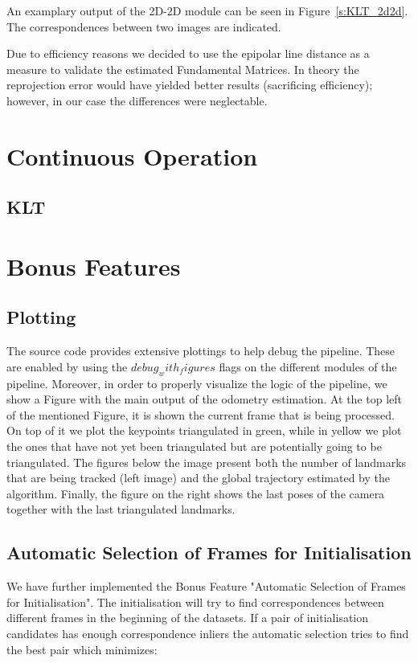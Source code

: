 An examplary output of the 2D-2D module can be seen in Figure~\ref{s:KLT_2d2d}. The correspondences between two images are indicated.

Due to efficiency reasons we decided to use the epipolar line distance as a measure to validate the estimated Fundamental Matrices. In theory the reprojection error would have yielded better results (sacrificing efficiency); however, in our case the differences were neglectable.

\section{Continuous Operation}
\label{s:ContOp}

\subsection{KLT}

\section{Bonus Features}
\label{s:BF}

\subsection{Plotting}
The source code provides extensive plottings to help debug the pipeline. These are enabled by using the $debug_with_figures$ flags
on the different modules of the pipeline. Moreover, in order to properly visualize the logic of the pipeline, we show a Figure 
with the main output of the odometry estimation.
At the top left of the mentioned Figure, it is shown the current frame that is being processed. On top of it we plot the keypoints
triangulated in green, while in yellow we plot the ones that have not yet been triangulated but are potentially going to be
triangulated.
The figures below the image present both the number of landmarks that are being tracked (left image) and the global trajectory
estimated by the algorithm.
Finally, the figure on the right shows the last poses of the camera together with the last triangulated landmarks.


\subsection{Automatic Selection of Frames for Initialisation}
We have further implemented the Bonus Feature "Automatic Selection of Frames for Initialisation". The initialisation will try to find correspondences between different frames in the beginning of the datasets. If a pair of initialisation candidates has enough correspondence inliers the automatic selection tries to find the best pair which minimizes:

